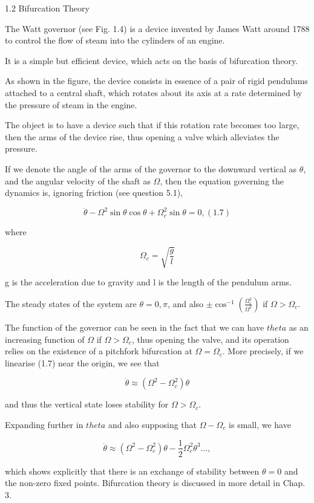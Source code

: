 \documentclass{article}
\begin{document}
1.2 Bifurcation Theory

The Watt governor (see Fig. 1.4) is a device invented by James Watt around 1788 to
control the flow of steam into the cylinders of an engine. 

It is a simple but efficient
device, which acts on the basis of bifurcation theory. 

As shown in the figure, the
device consists in essence of a pair of rigid pendulums attached to a central shaft,
which rotates about its axis at a rate determined by the pressure of steam in the engine.


The object is to have a device such that if this rotation rate becomes too large, then
the arms of the device rise, thus opening a valve which alleviates the pressure.


If we denote the angle of the arms of the governor to the downward vertical as $\theta$,
and the angular velocity of the shaft as $\Omega$, then the equation governing the dynamics
is, ignoring friction (see question 5.1),

\[
\ddot{\theta} - \Omega^2 \sin \theta \cos \theta + \Omega^2_c \sin \theta = 0, (1.7)
\]


where

\[
\Omega_c = \sqrt{\frac{g}{l}}
\]

g is the acceleration due to gravity and l is the length of the pendulum arms.

The steady states of the system are $\theta = 0, \pi$, and also $\pm \cos^{-1} (\frac{\Omega^2_c}{\Omega^2})$ if $\Omega > \Omega_c$.

The function of the governor can be seen in the fact that we can have $theta$ as an
increasing function of $\Omega$ if $\Omega > \Omega_c$, thus opening the valve, and its operation relies
on the existence of a pitchfork bifurcation at $\Omega = \Omega_c$. More precisely, if we linearise
(1.7) near the origin, we see that

\[
\ddot{\theta} \approx (\Omega^2 - \Omega^2_c) \theta
\]

and thus the vertical state loses stability for $\Omega > \Omega_c$.

Expanding further in $theta$ and also
supposing that $\Omega - \Omega_c$ is small, we have

\[
\ddot{\theta} \approx (\Omega^2 - \Omega^2_c) \theta - \frac{1}{2} \Omega^2_c \theta^3...,
\]

which shows explicitly that there is an exchange of stability between $\theta = 0$ and the
non-zero fixed points. Bifurcation theory is discussed in more detail in Chap. 3.
\end{document}
